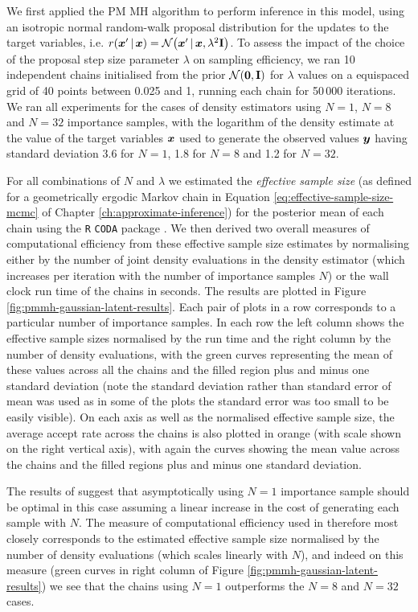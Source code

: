 We first applied the \ac{PM} \ac{MH} algorithm to perform inference in this model, using an isotropic normal random-walk proposal distribution for the updates to the target variables, i.e. $r(\vct{x}'\gvn\vct{x}) = \nrm{\vct{x}'\gvn\vct{x},\lambda^2\mathbf{I}}$. To assess the impact of the choice of the proposal step size parameter $\lambda$ on sampling efficiency, we ran 10 independent chains initialised from the prior $\nrm{\vct{0},\mathbf{I}}$ for $\lambda$ values on a equispaced grid of 40 points between 0.025 and 1, running each chain for 50\,000 iterations. We ran all experiments for the cases of density estimators using $N=1$, $N=8$ and $N=32$ importance samples, with the logarithm of the density estimate at the value of the target variables $\boldsymbol{x}$ used to generate the observed values $\boldsymbol{y}$ having standard deviation 3.6 for $N=1$, 1.8 for $N=8$ and 1.2 for $N=32$.

For all combinations of $N$ and $\lambda$ we estimated the \emph{effective sample size} (as defined for a geometrically ergodic Markov chain in Equation \ref{eq:effective-sample-size-mcmc} of Chapter \ref{ch:approximate-inference}) for the posterior mean of each chain using the \texttt{R} \texttt{CODA} package \citep{plummer2006coda}. We then derived two overall measures of computational efficiency from these effective sample size estimates by normalising either by the number of joint density evaluations in the density estimator (which increases per iteration with the number of importance samples $N$) or the wall clock run time of the chains in seconds. The results are plotted in Figure \ref{fig:pmmh-gaussian-latent-results}. Each pair of plots in a row corresponds to a particular number of importance samples. In each row the left column shows the effective sample sizes normalised by the run time and the right column by the number of density evaluations, with the green curves representing the mean of these values across all the chains and the filled region plus and minus one standard deviation (note the standard deviation rather than standard error of mean was used as in some of the plots the standard error was too small to be easily visible). On each axis as well as the normalised effective sample size, the average accept rate across the chains is also plotted in orange (with scale shown on the right vertical axis), with again the curves showing the mean value across the chains and the filled regions plus and minus one standard deviation.

The results of \citep{sherlock2016pseudo} suggest that asymptotically using $N=1$ importance sample should be optimal in this case assuming a linear increase in the cost of generating each sample with $N$. The measure of computational efficiency used in \citep{sherlock2016pseudo} therefore most closely corresponds to the estimated effective sample size normalised by the number of density evaluations (which scales linearly with $N$), and indeed on this measure (green curves in right column of Figure \ref{fig:pmmh-gaussian-latent-results}) we see that the chains using $N=1$ outperforms the $N=8$ and $N=32$ cases.

